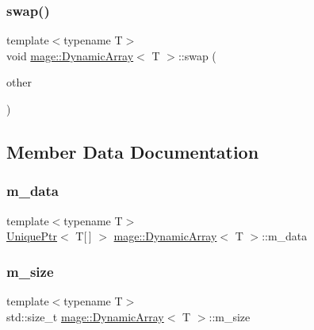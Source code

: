 \mbox{\label{classmage_1_1_dynamic_array_a43cb176cdff9d272b4b59584f572386b}} 
\subsubsection{\texorpdfstring{swap()}{swap()}}
{\footnotesize\ttfamily template$<$typename T$>$ \\
void \mbox{\hyperlink{classmage_1_1_dynamic_array}{mage\+::\+Dynamic\+Array}}$<$ T $>$\+::swap (\begin{DoxyParamCaption}\item[{\mbox{\hyperlink{classmage_1_1_dynamic_array}{Dynamic\+Array}}$<$ T $>$ \&}]{other }\end{DoxyParamCaption})\hspace{0.3cm}{\ttfamily [noexcept]}}



\subsection{Member Data Documentation}
\mbox{\label{classmage_1_1_dynamic_array_a4b2a43904083dc2d400ff6fa7afc38dd}} 
\subsubsection{\texorpdfstring{m\+\_\+data}{m\_data}}
{\footnotesize\ttfamily template$<$typename T$>$ \\
\mbox{\hyperlink{namespacemage_a3316d7143a973e37adf1110f2e80ca31}{Unique\+Ptr}}$<$ T\mbox{[}$\,$\mbox{]} $>$ \mbox{\hyperlink{classmage_1_1_dynamic_array}{mage\+::\+Dynamic\+Array}}$<$ T $>$\+::m\+\_\+data\hspace{0.3cm}{\ttfamily [private]}}

\mbox{\label{classmage_1_1_dynamic_array_a277e5d7aba77f108d7369f080eb36f60}} 
\subsubsection{\texorpdfstring{m\+\_\+size}{m\_size}}
{\footnotesize\ttfamily template$<$typename T$>$ \\
std\+::size\+\_\+t \mbox{\hyperlink{classmage_1_1_dynamic_array}{mage\+::\+Dynamic\+Array}}$<$ T $>$\+::m\+\_\+size\hspace{0.3cm}{\ttfamily [private]}}

